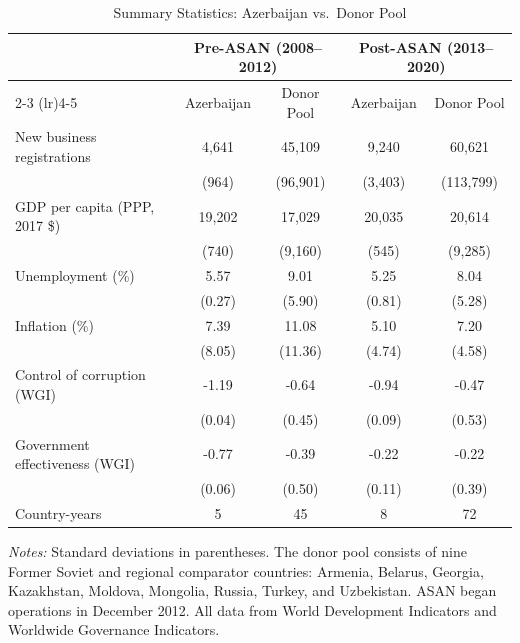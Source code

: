 \begin{table}[htbp]
\centering
\caption{Summary Statistics: Azerbaijan vs.\ Donor Pool}
\label{tab:summary}
\begin{tabular}{lcccc}
\hline\hline
 & \multicolumn{2}{c}{Pre-ASAN (2008--2012)} & \multicolumn{2}{c}{Post-ASAN (2013--2020)} \\
\cmidrule(lr){2-3} \cmidrule(lr){4-5}
 & Azerbaijan & Donor Pool & Azerbaijan & Donor Pool \\
\hline
New business registrations & 4,641 & 45,109 & 9,240 & 60,621 \\
 & (964) & (96,901) & (3,403) & (113,799) \\
GDP per capita (PPP, 2017 \$) & 19,202 & 17,029 & 20,035 & 20,614 \\
 & (740) & (9,160) & (545) & (9,285) \\
Unemployment (\%) & 5.57 & 9.01 & 5.25 & 8.04 \\
 & (0.27) & (5.90) & (0.81) & (5.28) \\
Inflation (\%) & 7.39 & 11.08 & 5.10 & 7.20 \\
 & (8.05) & (11.36) & (4.74) & (4.58) \\
Control of corruption (WGI) & -1.19 & -0.64 & -0.94 & -0.47 \\
 & (0.04) & (0.45) & (0.09) & (0.53) \\
Government effectiveness (WGI) & -0.77 & -0.39 & -0.22 & -0.22 \\
 & (0.06) & (0.50) & (0.11) & (0.39) \\
\hline
Country-years & 5 & 45 & 8 & 72 \\
\hline\hline
\end{tabular}
\par\vspace{0.3em}
{\footnotesize \textit{Notes:} Standard deviations in parentheses. The donor pool consists of nine Former Soviet and regional comparator countries: Armenia, Belarus, Georgia, Kazakhstan, Moldova, Mongolia, Russia, Turkey, and Uzbekistan. ASAN began operations in December 2012. All data from World Development Indicators and Worldwide Governance Indicators.}
\end{table}
